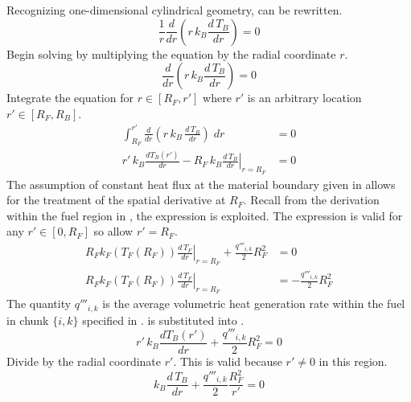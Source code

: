       Recognizing one-dimensional cylindrical geometry,  can 
      be rewritten.
      \begin{equation}
        \label{eq:tb_heat_conduction}
        \frac{1}{r} \frac{d}{dr} \left( r \, k_B \frac{d \, T_B}{dr} \right) = 0
      \end{equation}
      Begin solving  by multiplying the equation by
      the radial coordinate $r$.
      \begin{equation}
        \frac{d}{dr} \left( r \, k_B \frac{d \, T_B}{dr} \right) = 0
      \end{equation}
      Integrate the equation for $r \in[R_F,r']$ where $r'$ is an arbitrary
      location $r' \in [R_F,R_B]$.
      \begin{align}
        \int_{R_F}^{r'} \frac{d}{dr} \left( r\, k_B \, 
          \frac{d\,T_B}{dr} \right) \; dr &= 0\\
        \label{eq:tf_first_integral}
        r' \, k_B \frac{dT_B(r')}{dr} - 
          \left. R_F \, k_B \frac{d\,T_B}{dr} \right|_{r=R_F} &= 0
      \end{align}
      The assumption of constant heat flux at the material boundary given in 
       allows for the treatment of the spatial 
      derivative at $R_F$. Recall from the derivation within the fuel region in
      , the expression  is
      exploited. The expression is valid for any $r' \in [0,R_F]$ so allow
      $r'=R_F$.
      \begin{align}
        \left. R_F k_F(T_F(R_F)) \frac{d\,T_F}{dr} \right|_{r=R_F} + 
          \frac{q'''_{i,k}}{2} R_F^2 &= 0 \\
        \label{eq:surface_relation}
        \left. R_F k_F(T_F(R_F)) \frac{d\,T_F}{dr} \right|_{r=R_F} &= 
          - \frac{q'''_{i,k}}{2} R_F^2
      \end{align}
      The quantity $q'''_{i,k}$ is the average volumetric heat generation rate
      within the fuel in chunk $\{i,k\}$ specified in .
       is substituted into
      .
      \begin{equation}
        \label{eq:tf_first_bc}
        r' \, k_B \frac{dT_B(r')}{dr} +
          \frac{q'''_{i,k}}{2} R_F^2 = 0
      \end{equation}
      Divide  by the radial coordinate $r'$. This is
      valid because $r' \ne 0$ in this region.
      \begin{equation}
        k_B \frac{d\,T_B}{dr} + 
          \frac{q'''_{i,k}}{2} \frac{R_F^2}{r'} = 0
      \end{equation}
